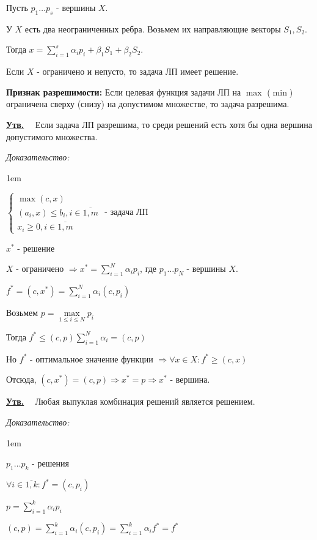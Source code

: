 \documentclass[11pt]{article}
\newenvironment{proof}{
  \textit{Доказательство:}
    
  \begin{adjustwidth}{1em}{}
}{
  \end{adjustwidth}
}
\newenvironment{statement}{
  \underline{\textbf{Утв.}}\ \ }{
  
}
\begin{document}
\begin{sloppypar}
\begin{enumerate}
  Пусть $p_1 \dots p_s$ - вершины $X$.
  
  У $X$ есть два неограниченных ребра. Возьмем их направляющие векторы $S_1, S_2$.
  
  Тогда $x = \sum_{i = 1}^s \alpha_i p_i + \beta_1 S_1 + \beta_2 S_2$.
\end{enumerate}

Если $X$ - ограничено и непусто, то задача ЛП имеет решение.

\textbf{Признак разрешимости:} Если целевая функция задачи ЛП на $\max$ ($\min$) ограничена сверху (снизу) на допустимом множестве, то задача разрешима.

\begin{statement}
  Если задача ЛП разрешима, то среди решений есть хотя бы одна вершина допустимого множества.
\end{statement}
\begin{proof}
  $\begin{cases}
    \max (c, x) \\
    (a_i, x) \leq b_i, i \in \overline{1, m} \\
    x_i \geq 0, i \in \overline{1, m}
  \end{cases}$ - задача ЛП
  
  $x^*$ - решение
  
  $X$ - ограничено $\Rightarrow x^* = \sum_{i = 1}^N \alpha_i p_i$, где $p_1 \dots p_N$ - вершины $X$.
  
  $f^* = (c, x^*) = \sum_{i = 1}^N \alpha_i (c, p_i)$
  
  Возьмем $p = \max\limits_{1 \leq i \leq N} p_i$
  
  Тогда $f^* \leq (c, p) \sum_{i = 1}^N \alpha_i = (c, p)$
  
  Но $f^*$ - оптимальное значение функции $\Rightarrow \forall x \in X: f^* \geq (c, x)$
  
  Отсюда, $(c, x^*) = (c, p) \Rightarrow x^* = p \Rightarrow x^*$ - вершина. 
\end{proof} 

\begin{statement}
  Любая выпуклая комбинация решений является решением.
\end{statement}
\begin{proof}
  $p_1 \dots p_k$ - решения
  
  $\forall i \in \overline{1, k}: f^* = (c, p_i)$
  
  $p = \sum_{i = 1}^k \alpha_i p_i$
  
  $(c, p) = \sum_{i = 1}^k \alpha_i (c, p_i) = \sum_{i = 1}^k \alpha_i f^* = f^*$
\end{proof}

\end{sloppypar}
\end{document}

